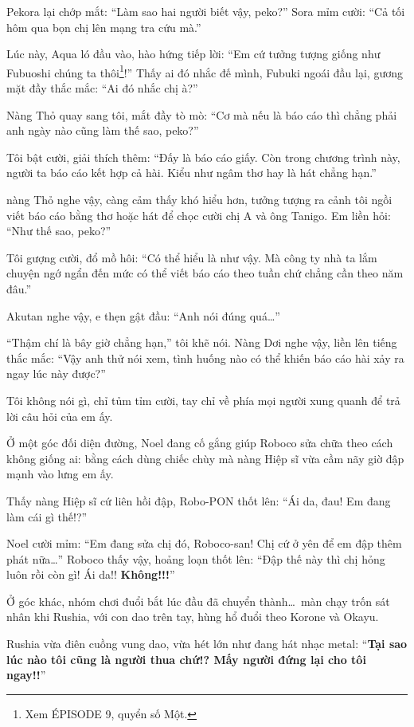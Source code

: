 \documentclass[../main.tex]{subfiles}
\begin{document}
Pekora lại chớp mắt: ``Làm sao hai người biết vậy, peko?'' Sora mỉm cười: ``Cả tối hôm qua bọn chị lên mạng tra cứu mà.''

Lúc này, Aqua ló đầu vào, hào hứng tiếp lời: ``Em cứ tưởng tượng giống như Fubuoshi chúng ta thôi\footnote{Xem {\flaregothic ÉPISODE 9}, quyển số Một.}!'' Thấy ai đó nhắc đế mình, Fubuki ngoái đầu lại, gương mặt đầy thắc mắc: ``Ai đó nhắc chị à?''

Nàng Thỏ quay sang tôi, mắt đầy tò mò: ``Cơ mà nếu là báo cáo thì chẳng phải anh ngày nào cũng làm thế sao, peko?''

Tôi bật cười, giải thích thêm: ``Đấy là báo cáo giấy. Còn trong chương trình này, người ta báo cáo kết hợp cả hài. Kiểu như ngâm thơ hay là hát chẳng hạn.''

nàng Thỏ nghe vậy, càng cảm thấy khó hiểu hơn, tưởng tượng ra cảnh tôi ngồi viết báo cáo bằng thơ hoặc hát để chọc cười chị A và ông Tanigo. Em liền hỏi: ``Như thế sao, peko?''

Tôi gượng cười, đổ mồ hôi: ``Có thể hiểu là như vậy. Mà công ty nhà ta lắm chuyện ngớ ngẩn đến mức có thể viết báo cáo theo tuần chứ chẳng cần theo năm đâu.''

Akutan nghe vậy, e thẹn gật đầu: ``Anh nói đúng quá\dots''

``Thậm chí là bây giờ chẳng hạn,'' tôi khẽ nói. Nàng Dơi nghe vậy, liền lên tiếng thắc mắc: ``Vậy anh thử nói xem, tình huống nào có thể khiến báo cáo hài xảy ra ngay lúc này được?''

Tôi không nói gì, chỉ tủm tỉm cười, tay chỉ về phía mọi người xung quanh để trả lời câu hỏi của em ấy.

Ở một góc đối diện đường, Noel đang cố gắng giúp Roboco sửa chữa theo cách không giống ai: bằng cách dùng chiếc chùy mà nàng Hiệp sĩ vừa cầm nãy giờ đập mạnh vào lưng em ấy.

Thấy nàng Hiệp sĩ cứ liên hồi đập, Robo-PON thốt lên: ``Ái da, đau! Em đang làm cái gì thế!?''

Noel cười mỉm: ``Em đang sửa chị đó, Roboco-san! Chị cứ ở yên để em đập thêm phát nữa\dots'' Roboco thấy vậy, hoảng loạn thốt lên: ``Đập thế này thì chị hỏng luôn rồi còn gì! Ái da!! \textbf{Không!!!}''

Ở góc khác, nhóm chơi đuổi bắt lúc đầu đã chuyển thành\dots\ màn chạy trốn sát nhân khi Rushia, với con dao trên tay, hùng hổ đuổi theo Korone và Okayu.

Rushia vừa điên cuồng vung dao, vừa hét lớn như đang hát nhạc metal: ``\textbf{Tại sao lúc nào tôi cũng là người thua chứ!? Mấy người đứng lại cho tôi ngay!!}''
\end{document}
